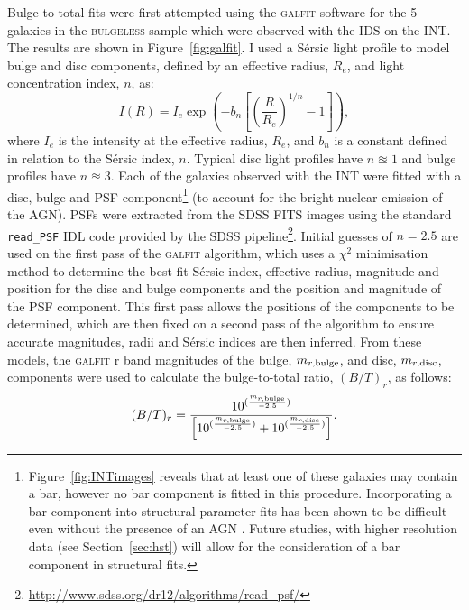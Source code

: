 {Bulge-to-total fits were first attempted using the \textsc{galfit} software \citep{peng02} for the 5 galaxies in the \textsc{bulgeless} sample which were observed with the IDS on the INT. The results are shown in Figure~\ref{fig:galfit}. I used a S\'ersic light profile \citep{sersic68} to model bulge and disc components, defined by an effective radius, $R_e$, and light concentration index, $n$, as:
\begin{equation}\label{sersic}
I(R) = I_e \exp \left(  -b_n \left[  \left( \frac{R}{R_e}\right)^{1/n} -1 \right] \right),
\end{equation}
where $I_e$ is the intensity at the effective radius, $R_e$, and $b_n$ is a constant defined in relation to the S\'ersic index, $n$. Typical disc light profiles have $n\approxeq1$ and bulge profiles have $n\approxeq3$. Each of the galaxies observed with the INT were fitted with a disc, bulge and PSF component\footnote{Figure~\ref{fig:INTimages} reveals that at least one of these galaxies may contain a bar, however no bar component is fitted in this procedure. Incorporating a bar component into structural parameter fits has been shown to be difficult even without the presence of an AGN \citep{kruk16}. Future studies, with higher resolution data (see Section~\ref{sec:hst}) will allow for the consideration of a bar component in structural fits.} (to account for the bright nuclear emission of the AGN). PSFs were extracted from the SDSS FITS images using the standard \texttt{read\_PSF} IDL code provided by the SDSS pipeline\footnote{\url{http://www.sdss.org/dr12/algorithms/read_psf/}}. Initial guesses of $n=2.5$ are used on the first pass of the \textsc{galfit} algorithm, which uses a $\chi^2$ minimisation method to determine the best fit S\'ersic index, effective radius, magnitude and position for the disc and bulge components and the position and magnitude of the PSF component. This first pass allows the positions of the components to be determined, which are then fixed on a second pass of the algorithm to ensure accurate magnitudes, radii and S\'ersic indices are then inferred. From these models, the \textsc{galfit} r band magnitudes of the bulge, $m_{r, \rm{bulge}}$, and disc, $m_{r, \rm{disc}}$, components were used to calculate the bulge-to-total ratio, $(B/T)_r$, as follows:
\begin{equation}\label{btratio}
(B/T)_r = \frac{10^{(\frac{m_{r, \rm{bulge}}}{-2.5})}}{\left[10^{(\frac{m_{r, \rm{bulge}}}{-2.5})} + 10^{(\frac{m_{r, \rm{disc}}}{-2.5})}\right]}.
\end{equation}

}
